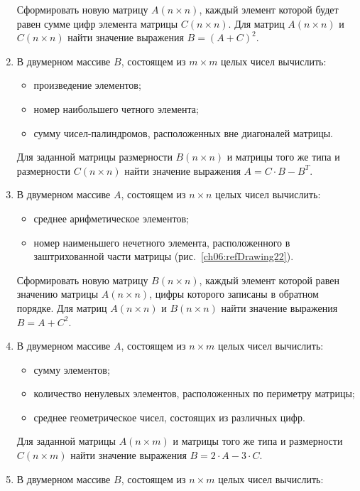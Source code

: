 \begin{enumerate}
Сформировать новую матрицу $A(n\times n)$, каждый элемент которой будет равен сумме цифр
элемента матрицы $C(n\times n)$. Для матриц $A(n\times n)$ и
$C(n\times n)$ найти значение выражения  $B=(A+C)^2$.
\item В двумерном массиве $B$, состоящем из $m\times m$ целых чисел вычислить: 
\begin{itemize}
\item произведение элементов;
\item номер наибольшего четного элемента;
\item сумму чисел-палиндромов, расположенных вне диагоналей матрицы.
\end{itemize}

Для заданной матрицы размерности $B(n\times n)$ и матрицы того же типа и
размерности $C(n\times n)$ найти значение выражения   $A=C\cdot B-B^T$.
\item В двумерном массиве $A$, состоящем из $n\times n$ целых чисел вычислить:

\begin{itemize}
\item среднее арифметическое элементов;
\item номер наименьшего нечетного элемента, расположенного в заштрихованной части матрицы (рис.~\ref{ch06:refDrawing22}).
\end{itemize}

Сформировать новую матрицу $B(n\times n)$, каждый элемент которой равен значению матрицы
$A(n\times n)$, цифры которого записаны в обратном порядке. Для матриц
$A(n\times n)$ и $B(n\times n)$ найти значение выражения  $B=A+C^2$.



\item В двумерном массиве $A$, состоящем из $n\times m$ целых чисел вычислить: 

\begin{itemize}
\item сумму элементов;
\item количество ненулевых элементов, расположенных по периметру матрицы;
\item среднее геометрическое чисел, состоящих из различных цифр.
\end{itemize}

Для заданной матрицы $A(n\times m)$ и матрицы того же типа и размерности
$C(n\times m)$ найти значение выражения  $B=2\cdot A-3\cdot C$.
\item В двумерном массиве $B$, состоящем из $n\times m$ целых чисел вычислить:


\end{enumerate}
